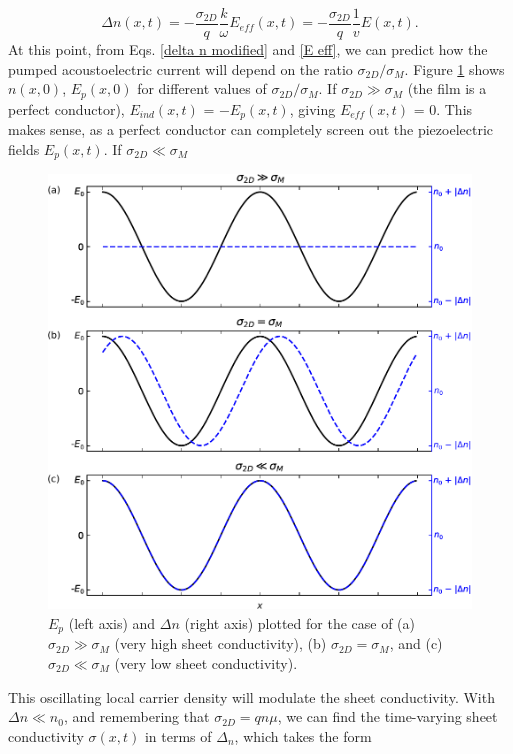 \documentclass[double,12pt,1in]{beavtex}
\begin{document}
\begin{equation}
    \Delta n(x,t) = -\frac{\sigma_{2D}}{q} \frac{k}{\omega} E_{eff}(x,t) = -\frac{\sigma_{2D}}{q} \frac{1}{v}E(x,t). \label{delta n modified}
\end{equation}
At this point, from Eqs. \ref{delta n modified} and \ref{E eff}, we can predict how the pumped acoustoelectric current will depend on the ratio $\sigma_{2D}/\sigma_M$. Figure \ref{piezoelectric field and delta n} shows $n(x,0)$, $E_p(x,0)$ for different values of $\sigma_{2D}/\sigma_M$. If $\sigma_{2D} \gg \sigma_M$ (the film is a perfect conductor), $E_{ind}(x,t)$ = $-E_p(x,t)$, giving $E_{eff}(x,t)$ = 0. This makes sense, as a perfect conductor can completely screen out the piezoelectric fields $E_p(x,t)$. If $\sigma_{2D} \ll \sigma_M$

\begin{figure}
    \includegraphics{piezoelectric field and delta n edited.pdf}
    \caption{$E_p$ (left axis) and $\Delta n$ (right axis) plotted for the case of (a) $\sigma_{2D} \gg \sigma_M$ (very high sheet conductivity), (b) $\sigma_{2D} = \sigma_M$, and (c) $\sigma_{2D} \ll \sigma_M$ (very low sheet conductivity).}
    \label{piezoelectric field and delta n}
\end{figure}
This oscillating local carrier density will modulate the sheet conductivity. With $\Delta n \ll n_0$, and remembering that $\sigma_{2D} = q n \mu$, we can find the time-varying  sheet conductivity $\sigma(x,t)$ in terms of $\Delta_n$, which takes the form
\end{document}
